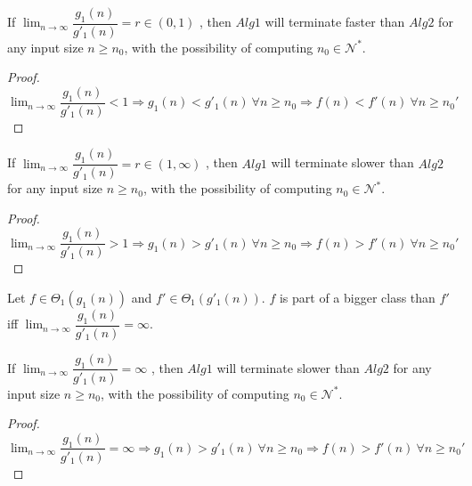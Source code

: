 \begin{lemma}
If  $ \lim_{n\to\infty} \dfrac{g_{1}(n)}{g'_{1}(n)} = r \in (0,1) $ , then $Alg1$ will terminate faster than $Alg2$ for any input size $n \geq n_{0}$, with the possibility of computing $n_{0} \in \mathcal{N}^{*}$.
\end{lemma}
\begin{proof}
$\lim_{n\to\infty} \dfrac{g_{1}(n)}{g'_{1}(n)} < 1 \Rightarrow g_{1}(n) < g'_{1}(n)\ \forall n \geq n_{0} \Rightarrow f(n) < f'(n) \ \forall n \geq n_{0}'$
\end{proof}

\begin{lemma}
If  $ \lim_{n\to\infty} \dfrac{g_{1}(n)}{g'_{1}(n)} = r \in (1,\infty) $ , then $Alg1$ will terminate slower than $Alg2$ for any input size $n \geq n_{0}$, with the possibility of computing $n_{0} \in \mathcal{N}^{*}$.
\end{lemma}
\begin{proof}
$\lim_{n\to\infty} \dfrac{g_{1}(n)}{g'_{1}(n)} > 1 \Rightarrow g_{1}(n) > g'_{1}(n)\ \forall n \geq n_{0} \Rightarrow f(n) > f'(n) \ \forall n \geq n_{0}'$
\end{proof}



\begin{definition}
Let $f \in \Theta_{1}(g_{1}(n))$ and $f' \in \Theta_{1}(g'_{1}(n))$. $f$ is part of a bigger class than $f'$ iff $\lim_{n\to\infty} \dfrac{g_{1}(n)}{g'_{1}(n)} = \infty$.
\end{definition}
\begin{lemma}
If  $ \lim_{n\to\infty} \dfrac{g_{1}(n)}{g'_{1}(n)} = \infty $ , then $Alg1$ will terminate slower than $Alg2$ for any input size $n \geq n_{0}$, with the possibility of computing $n_{0} \in \mathcal{N}^{*}$.
\end{lemma}
\begin{proof}
$\lim_{n\to\infty} \dfrac{g_{1}(n)}{g'_{1}(n)} = \infty \Rightarrow g_{1}(n) > g'_{1}(n)\ \forall n \geq n_{0} \Rightarrow f(n) > f'(n) \ \forall n \geq n_{0}'$
\end{proof}

